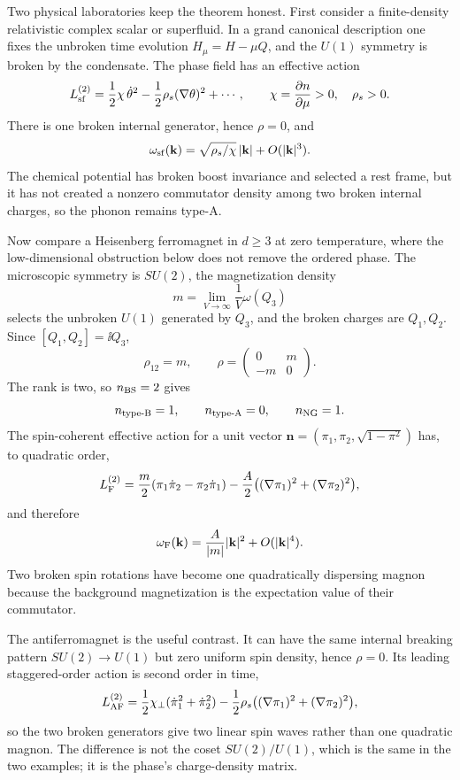 Two physical laboratories keep the theorem honest.  First consider a
finite-density relativistic complex scalar or superfluid.  In a grand
canonical description one fixes the unbroken time evolution
\(H_\mu=H-\mu Q\), and the \(U(1)\) symmetry is broken by the condensate.  The
phase field has an effective action
\[
  L_{\rm sf}^{(2)}
  =
  \frac12\chi\,\dot\theta^2
  -
  \frac12\rho_s(\nabla\theta)^2+\cdots ,
  \qquad
  \chi=\frac{\partial n}{\partial\mu}>0,\quad \rho_s>0 .
\]
There is one broken internal generator, hence \(\rho=0\), and
\[
  \omega_{\rm sf}(\mathbf k)
  =
  \sqrt{\rho_s/\chi}\,|\mathbf k|+O(|\mathbf k|^3).
\]
The chemical potential has broken boost invariance and selected a rest frame,
but it has not created a nonzero commutator density among two broken internal
charges, so the phonon remains type-A.

Now compare a Heisenberg ferromagnet in \(d\ge3\) at zero temperature, where
the low-dimensional obstruction below does not remove the ordered phase.  The
microscopic symmetry is \(SU(2)\), the magnetization density
\[
  m=\lim_{V\to\infty}\frac{1}{V}\omega(Q_3)
\]
selects the unbroken \(U(1)\) generated by \(Q_3\), and the broken charges are
\(Q_1,Q_2\).  Since
\([Q_1,Q_2]=\ii Q_3\),
\[
  \rho_{12}=m,\qquad
  \rho=
  \begin{pmatrix}0&m\\-m&0\end{pmatrix}.
\]
The rank is two, so \(n_{\rm BS}=2\) gives
\[
  n_{\rm type\text{-}B}=1,\qquad
  n_{\rm type\text{-}A}=0,\qquad
  n_{\rm NG}=1 .
\]
The spin-coherent effective action for a unit vector
\(\mathbf n=(\pi_1,\pi_2,\sqrt{1-\pi^2})\) has, to quadratic order,
\[
  L_{\rm F}^{(2)}
  =
  \frac{m}{2}(\pi_1\dot\pi_2-\pi_2\dot\pi_1)
  -
  \frac{A}{2}\bigl((\nabla\pi_1)^2+(\nabla\pi_2)^2\bigr),
\]
and therefore
\[
  \omega_{\rm F}(\mathbf k)=\frac{A}{|m|}|\mathbf k|^2+O(|\mathbf k|^4).
\]
Two broken spin rotations have become one quadratically dispersing magnon
because the background magnetization is the expectation value of their
commutator.

The antiferromagnet is the useful contrast.  It can have the same internal
breaking pattern \(SU(2)\to U(1)\) but zero uniform spin density, hence
\(\rho=0\).  Its leading staggered-order action is second order in time,
\[
  L_{\rm AF}^{(2)}
  =
  \frac12\chi_\perp(\dot\pi_1^2+\dot\pi_2^2)
  -
  \frac12\rho_s\bigl((\nabla\pi_1)^2+(\nabla\pi_2)^2\bigr),
\]
so the two broken generators give two linear spin waves rather than one
quadratic magnon.  The difference is not the coset \(SU(2)/U(1)\), which is
the same in the two examples; it is the phase's charge-density matrix.

